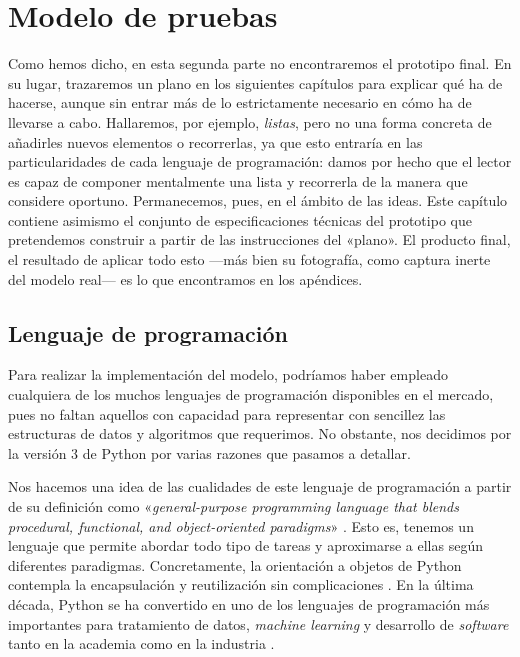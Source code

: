 \section{Modelo de pruebas}
Como hemos dicho, en esta segunda parte no encontraremos el prototipo final. En su lugar, trazaremos un plano en los siguientes capítulos para explicar qué ha de hacerse, aunque sin entrar más de lo estrictamente necesario en cómo ha de llevarse a cabo. Hallaremos, por ejemplo, \textit{listas}, pero no una forma concreta de añadirles nuevos elementos o recorrerlas, ya que esto entraría en las particularidades de cada lenguaje de programación: damos por hecho que el lector es capaz de componer mentalmente una lista y recorrerla de la manera que considere oportuno. Permanecemos, pues, en el ámbito de las ideas. Este capítulo contiene asimismo el conjunto de especificaciones técnicas del prototipo que pretendemos construir a partir de las instrucciones del «plano». El producto final, el resultado de aplicar todo esto —más bien su fotografía, como captura inerte del modelo real— es lo que encontramos en los apéndices.

\subsection{Lenguaje de programación}
Para realizar la implementación del modelo, podríamos haber empleado cualquiera de los muchos lenguajes de programación disponibles en el mercado, pues no faltan aquellos con capacidad para representar con sencillez las estructuras de datos y algoritmos que requerimos. No obstante, nos decidimos por la versión 3 de Python por varias razones que pasamos a detallar.

Nos hacemos una idea de las cualidades de este lenguaje de programación a partir de su definición como «\textit{general-purpose programming language that blends procedural, functional, and object-oriented paradigms}» \parencite[p. 6, énfasis en el original]{lutz2013}. Esto es, tenemos un lenguaje que permite abordar todo tipo de tareas y aproximarse a ellas según diferentes paradigmas. Concretamente, la orientación a objetos de Python contempla la encapsulación y reutilización sin complicaciones \parencite[xiii]{bird2009}. En la última década, Python se ha convertido en uno de los lenguajes de programación más importantes para tratamiento de datos, \textit{machine learning} y desarrollo de \textit{software} tanto en la academia como en la industria \parencite[2]{mckinney2018}.

